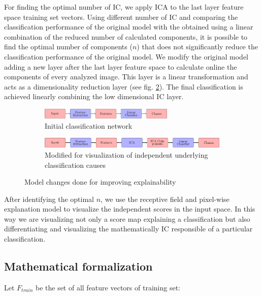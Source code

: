 \documentclass[review]{elsarticle}
\theoremstyle{definition} %
\theoremstyle{remark}
\begin{document}
For finding the optimal number of IC, we apply ICA to the last layer feature space training set vectors. Using different number of IC and comparing the classification performance of the original model with the obtained using a linear combination of the reduced number of calculated components, it is possible to find the optimal number of components ($n$) that does not significantly reduce the classification performance of the original model. We modify the original model adding a new layer after the last layer feature space to calculate online the components of every analyzed image. This layer is a linear transformation and acts as a dimensionality reduction layer (see fig. \ref{fig:models}). The final classification is achieved linearly combining the low dimensional IC layer. 

\begin{figure}[h!]
	\centering
	\begin{subfigure}[b]{\textwidth}
		\centering
		\includegraphics[width=0.7\textwidth]{./figures/initial_classifier.pdf}
		\caption{Initial classification network}	
	\end{subfigure}
	\hfill   
	\begin{subfigure}[b]{\textwidth}
		\centering
		\includegraphics[width=\textwidth]{./figures/ica_classifier.pdf}
		\caption{Modified for visualization of independent underlying classification causes}
		\label{fig:models_ica}
	\end{subfigure}
	\caption{Model changes done for improving explainability}  
	\label{fig:models} 
\end{figure}

After identifying the optimal $n$, we use the receptive field and pixel-wise explanation model \cite{de2017deep} to visualize the independent scores in the input space. In this way we are visualizing not only a score map explaining a classification but also differentiating and visualizing the mathematically IC responsible of a particular classification. 

\subsection{Mathematical formalization}

Let $F_{train}$ be the set of all feature vectors of training set:
\end{document}
